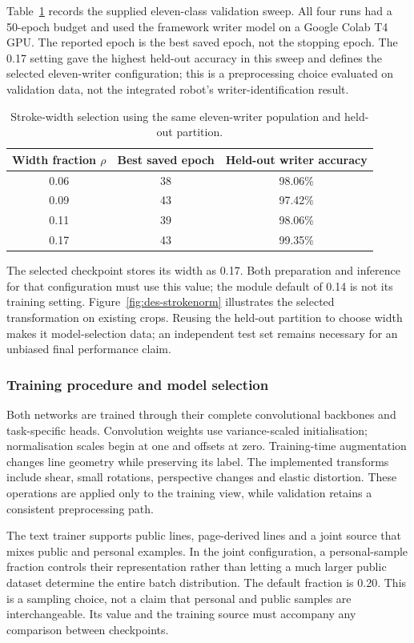 Table~\ref{tab:des-widthselection} records the supplied eleven-class validation sweep. All four runs had a 50-epoch budget and used the framework writer model on a Google Colab T4 GPU. The reported epoch is the best saved epoch, not the stopping epoch. The 0.17 setting gave the highest held-out accuracy in this sweep and defines the selected eleven-writer configuration; this is a preprocessing choice evaluated on validation data, not the integrated robot's writer-identification result.
\begin{table}[!htbp]\centering\small
\begin{tabular}{|c|c|c|}
\hline\textbf{Width fraction $\rho$}&\textbf{Best saved epoch}&\textbf{Held-out writer accuracy}\\\hline
0.06&38&98.06\%\\\hline
0.09&43&97.42\%\\\hline
0.11&39&98.06\%\\\hline
0.17&43&99.35\%\\\hline
\end{tabular}
\caption{Stroke-width selection using the same eleven-writer population and held-out partition.}
\label{tab:des-widthselection}
\end{table}
The selected checkpoint stores its width as 0.17. Both preparation and inference for that configuration must use this value; the module default of 0.14 is not its training setting. Figure~\ref{fig:des-strokenorm} illustrates the selected transformation on existing crops. Reusing the held-out partition to choose width makes it model-selection data; an independent test set remains necessary for an unbiased final performance claim.

\subsubsection{Training procedure and model selection}
\label{sec:des-training}
Both networks are trained through their complete convolutional backbones and task-specific heads. Convolution weights use variance-scaled initialisation; normalisation scales begin at one and offsets at zero. Training-time augmentation changes line geometry while preserving its label. The implemented transforms include shear, small rotations, perspective changes and elastic distortion. These operations are applied only to the training view, while validation retains a consistent preprocessing path.

The text trainer supports public lines, page-derived lines and a joint source that mixes public and personal examples. In the joint configuration, a personal-sample fraction controls their representation rather than letting a much larger public dataset determine the entire batch distribution. The default fraction is 0.20. This is a sampling choice, not a claim that personal and public samples are interchangeable. Its value and the training source must accompany any comparison between checkpoints.

